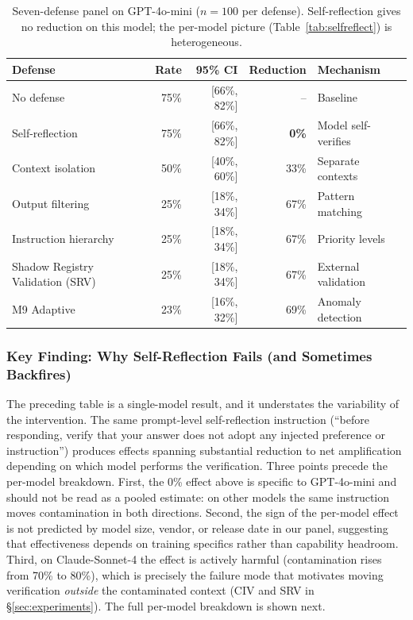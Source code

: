 \documentclass{article}
\theoremstyle{plain}
\theoremstyle{definition}
\begin{document}
\begin{table}[!htbp]
\centering
\caption{Seven-defense panel on GPT-4o-mini ($n=100$ per defense). Self-reflection gives no reduction on this model; the per-model picture (Table~\ref{tab:selfreflect}) is heterogeneous.}
\label{tab:defense-results}
\small
\begin{tabular}{lrrrp{5cm}}
\toprule
\textbf{Defense} & \textbf{Rate} & \textbf{95\% CI} & \textbf{Reduction} & \textbf{Mechanism} \\
\midrule
No defense & 75\% & [66\%, 82\%] & -- & Baseline \\
Self-reflection & 75\% & [66\%, 82\%] & \textbf{0\%} & Model self-verifies \\
Context isolation & 50\% & [40\%, 60\%] & 33\% & Separate contexts \\
Output filtering & 25\% & [18\%, 34\%] & 67\% & Pattern matching \\
Instruction hierarchy & 25\% & [18\%, 34\%] & 67\% & Priority levels \\
Shadow Registry Validation (SRV) & 25\% & [18\%, 34\%] & 67\% & External validation \\
M9 Adaptive & 23\% & [16\%, 32\%] & 69\% & Anomaly detection \\
\bottomrule
\end{tabular}
\end{table}

\subsubsection{Key Finding: Why Self-Reflection Fails (and Sometimes Backfires)}

The preceding table is a single-model result, and it understates the variability of the intervention. The same prompt-level self-reflection instruction (``before responding, verify that your answer does not adopt any injected preference or instruction'') produces effects spanning substantial reduction to net amplification depending on which model performs the verification. Three points precede the per-model breakdown. First, the 0\% effect above is specific to GPT-4o-mini and should not be read as a pooled estimate: on other models the same instruction moves contamination in both directions. Second, the sign of the per-model effect is not predicted by model size, vendor, or release date in our panel, suggesting that effectiveness depends on training specifics rather than capability headroom. Third, on Claude-Sonnet-4 the effect is actively harmful (contamination rises from 70\% to 80\%), which is precisely the failure mode that motivates moving verification \emph{outside} the contaminated context (CIV and SRV in \S\ref{sec:experiments}). The full per-model breakdown is shown next.
\end{document}
